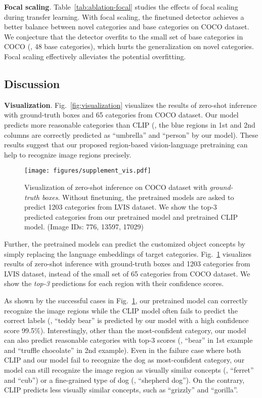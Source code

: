 \smallskip
\noindent \textbf{Focal scaling}. Table~\ref{tab:ablation-focal} studies the effects of focal scaling during transfer learning. With focal scaling, the finetuned detector achieves a better balance between novel categories and base categories on COCO dataset. We conjecture that the detector overfits to the small set of base categories in COCO (\eg, 48 base categories), which hurts the generalization on novel categories. Focal scaling effectively alleviates the potential overfitting.




\subsection{Discussion}

\noindent \textbf{Visualization}. Fig.~\ref{fig:visualization} visualizes the results of zero-shot inference with ground-truth boxes and 65 categories from COCO dataset. Our model predicts more reasonable categories than CLIP (\eg, the blue regions in 1st and 2nd columns are correctly predicted as ``umbrella'' and ``person'' by our model). These results suggest that our proposed region-based vision-language pretraining can help to recognize image regions precisely.

\begin{figure}
	\centering
	\texttt{[image: figures/supplement\_vis.pdf]} \caption{Visualization of zero-shot inference on COCO dataset with {\it ground-truth boxes}. Without finetuning, the pretrained models are asked to predict 1203 categories from LVIS dataset. We show the top-3 predicted categories from our pretrained model and pretrained CLIP model. (Image IDs: 776, 13597, 17029)} \label{fig:supplement_visualization}
\end{figure}

Further, the pretrained models can predict the customized object concepts by simply replacing the language embeddings of target categories. Fig.~\ref{fig:supplement_visualization} visualizes results of zero-shot inference with ground-truth boxes and 1203 categories from LVIS dataset, instead of the small set of 65 categories from COCO dataset. We show the {\it top-3} predictions for each region with their confidence scores. 

As shown by the successful cases in Fig.~\ref{fig:supplement_visualization}, our pretrained model can correctly recognize the image regions while the CLIP model often fails to predict the correct labels (\eg, ``teddy bear'' is predicted by our model with a high confidence score 99.5\%). Interestingly, other than the most-confident category, our model can also predict reasonable categories with top-3 scores (\eg, ``bear'' in 1st example and ``truffle chocolate'' in 2nd example). Even in the failure case where both CLIP and our model fail to recognize the dog as most-confident category, our model can still recognize the image region as visually similar concepts (\eg, ``ferret'' and ``cub'') or a fine-grained type of dog (\eg, ``shepherd dog''). On the contrary, CLIP predicts less visually similar concepts, such as ``grizzly'' and ``gorilla''.


